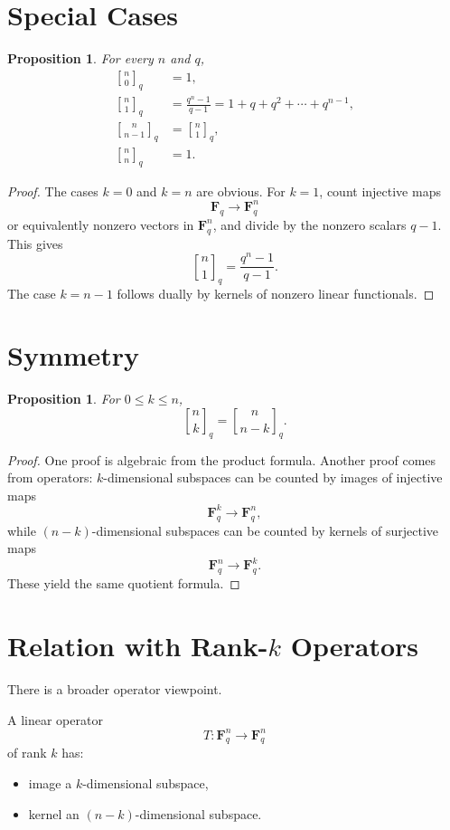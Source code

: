 \documentclass[11pt]{article}
\newtheorem{proposition}[theorem]{Proposition}
\theoremstyle{definition}
\theoremstyle{remark}
\newcommand{\F}{\mathbf{F}}
\newcommand{\qbinom}[2]{\genfrac{[}{]}{0pt}{}{#1}{#2}_q}
\begin{document}
	\section{Special Cases}
	
	\begin{proposition}
		For every \(n\) and \(q\),
		\begin{align*}
			\qbinom{n}{0} &= 1,\\
			\qbinom{n}{1} &= \frac{q^n-1}{q-1}=1+q+q^2+\cdots+q^{n-1},\\
			\qbinom{n}{n-1} &= \qbinom{n}{1},\\
			\qbinom{n}{n} &= 1.
		\end{align*}
	\end{proposition}
	
	\begin{proof}
		The cases \(k=0\) and \(k=n\) are obvious. For \(k=1\), count injective maps
		\[
		\F_q\to \F_q^n
		\]
		or equivalently nonzero vectors in \(\F_q^n\), and divide by the nonzero scalars \(q-1\). This gives
		\[
		\qbinom{n}{1}=\frac{q^n-1}{q-1}.
		\]
		The case \(k=n-1\) follows dually by kernels of nonzero linear functionals.
	\end{proof}
	
	\section{Symmetry}
	
	\begin{proposition}
		For \(0\le k\le n\),
		\[
		\qbinom{n}{k}=\qbinom{n}{n-k}.
		\]
	\end{proposition}
	
	\begin{proof}
		One proof is algebraic from the product formula. Another proof comes from operators: \(k\)-dimensional subspaces can be counted by images of injective maps
		\[
		\F_q^k\to \F_q^n,
		\]
		while \((n-k)\)-dimensional subspaces can be counted by kernels of surjective maps
		\[
		\F_q^n\to \F_q^k.
		\]
		These yield the same quotient formula.
	\end{proof}
	
	\section{Relation with Rank-\(k\) Operators}
	
	There is a broader operator viewpoint.
	
	A linear operator
	\[
	T:\F_q^n\to \F_q^n
	\]
	of rank \(k\) has:
	\begin{itemize}
		\item image a \(k\)-dimensional subspace,
		\item kernel an \((n-k)\)-dimensional subspace.
	\end{itemize}
	
\end{document}
